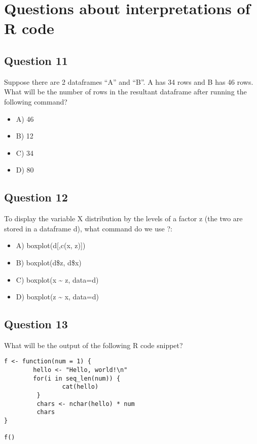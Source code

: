 \documentclass[11pt]{article}
\begin{document}
\section*{Questions about interpretations of R code}
\label{sec:org2d54452}
\subsection*{Question 11}
\label{sec:org79824cf}
Suppose there are 2 dataframes “A” and “B”. A has 34 rows and B has 46
rows. What will be the number of rows in the resultant dataframe after running
the following command?
\begin{itemize}
\item A) 46

\item B) 12

\item C) 34

\item D) 80
\end{itemize}

\subsection*{Question 12}
\label{sec:org9e0ce01}
To display the variable X distribution by the levels of a factor z (the two are
stored in a dataframe d), what command do we use ?:

\begin{itemize}
\item A) boxplot(d[,c(x, z)])

\item B) boxplot(d\$z, d\$x)

\item C) boxplot(x \textasciitilde{} z, data=d)

\item D) boxplot(z \textasciitilde{} x, data=d)
\end{itemize}

\subsection*{Question 13}
\label{sec:org4ce2fa4}
What will be the output of the following R code snippet?

\begin{verbatim}
f <- function(num = 1) {
        hello <- "Hello, world!\n"
        for(i in seq_len(num)) {
                cat(hello)
         }
         chars <- nchar(hello) * num
         chars
}

f()
\end{verbatim}
\end{document}
